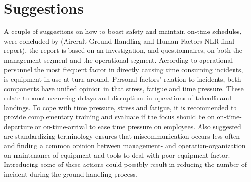 \section{Suggestions}
    A couple of suggestions on how to boost safety and maintain on-time schedules, were concluded by (Aircraft-Ground-Handling-and-Human-Factors-NLR-final-report), the report is based on an investigation, and questionnaires, on both the management segment and the operational segment. According to operational personnel the most frequent factor in directly causing time consuming incidents, is equipment in use at turn-around. Personal factors' relation to incidents, both components have unified opinion in that stress, fatigue and time pressure. These relate to most occurring delays and disruptions in operations of takeoffs and landings. To cope with time pressure, stress and fatigue, it is recommended to provide complementary training and evaluate if the focus should be on on-time-departure or on-time-arrival to ease time pressure on employees. Also suggested are standardizing terminology ensures that miscommunication occurs less often and finding a common opinion between management- and operation-organization on maintenance of equipment and tools to deal with poor equipment factor. Introducing some of these actions could possibly result in reducing the number of incident during the ground handling process.

